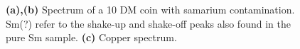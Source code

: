 \documentclass[a4paper]{scrartcl}
\numberwithin{equation}{section}
\numberwithin{figure}{section}
\numberwithin{table}{section}
\begin{document}
\begin{figure}
 \caption{\small \textbf{(a),(b) }Spectrum of a 10 DM coin with samarium contamination. Sm(?) refer to the shake-up and shake-off peaks also found in the pure Sm sample. \textbf{(c)} Copper spectrum. }
        \label{fig:DM}
\end{figure}

\FloatBarrier
\clearpage
 

\end{document}
